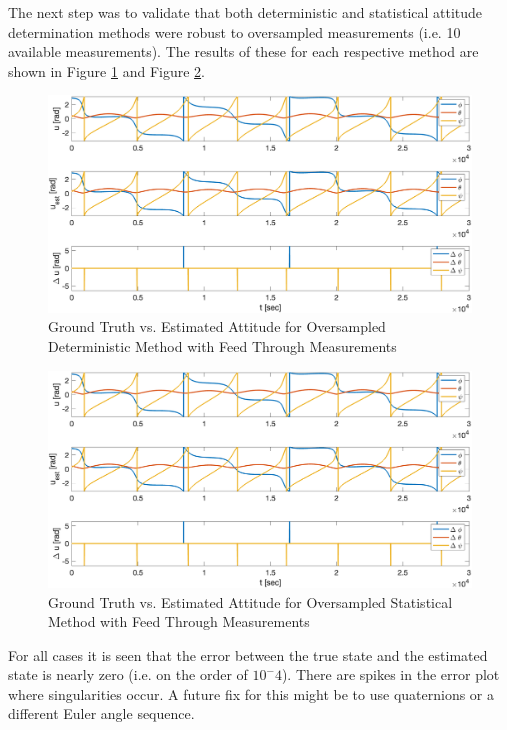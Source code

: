 The next step was to validate that both deterministic and statistical attitude determination methods were robust to oversampled measurements (i.e. 10 available measurements). The results of these for each respective method are shown in Figure \ref{fig:det_attitude_oversampled_default} and Figure \ref{fig:stat_attitude_oversampled_default}. 

\begin{figure}[H]
    \centering
    \includegraphics[width = 12cm]{Images/PS6/attitude_estimation_oversampled_det_default.png}
    \caption{Ground Truth vs. Estimated Attitude for Oversampled Deterministic Method with Feed Through Measurements}
    \label{fig:det_attitude_oversampled_default}
\end{figure}

\begin{figure}[H]
    \centering
    \includegraphics[width = 12cm]{Images/PS6/attitude_estimation_oversampled_q_default.png}
    \caption{Ground Truth vs. Estimated Attitude for Oversampled Statistical Method with Feed Through Measurements}
    \label{fig:stat_attitude_oversampled_default}
\end{figure}

For all cases it is seen that the error between the true state and the estimated state is nearly zero (i.e. on the order of $10^-4$). There are spikes in the error plot where singularities occur. A future fix for this might be to use quaternions or a different Euler angle sequence. 

